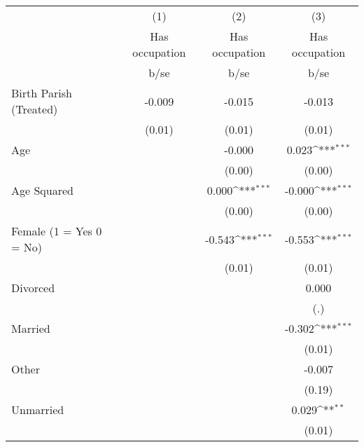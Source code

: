 {
\def\sym#1{\ifmmode^{#1}\else\(^{#1}\)\fi}
\begin{tabular}{l*{3}{c}}
\hline\hline
                    &\multicolumn{1}{c}{(1)}&\multicolumn{1}{c}{(2)}&\multicolumn{1}{c}{(3)}\\
                    &\multicolumn{1}{c}{Has occupation}&\multicolumn{1}{c}{Has occupation}&\multicolumn{1}{c}{Has occupation}\\
                    &        b/se         &        b/se         &        b/se         \\
\hline
Birth Parish (Treated)&      -0.009         &      -0.015         &      -0.013         \\
                    &      (0.01)         &      (0.01)         &      (0.01)         \\
Age                 &                     &      -0.000         &       0.023\sym{***}\\
                    &                     &      (0.00)         &      (0.00)         \\
Age Squared         &                     &       0.000\sym{***}&      -0.000\sym{***}\\
                    &                     &      (0.00)         &      (0.00)         \\
Female (1 = Yes 0 = No)&                     &      -0.543\sym{***}&      -0.553\sym{***}\\
                    &                     &      (0.01)         &      (0.01)         \\
Divorced            &                     &                     &       0.000         \\
                    &                     &                     &         (.)         \\
Married             &                     &                     &      -0.302\sym{***}\\
                    &                     &                     &      (0.01)         \\
Other               &                     &                     &      -0.007         \\
                    &                     &                     &      (0.19)         \\
Unmarried           &                     &                     &       0.029\sym{**} \\
                    &                     &                     &      (0.01)         \\

\end{tabular}}

